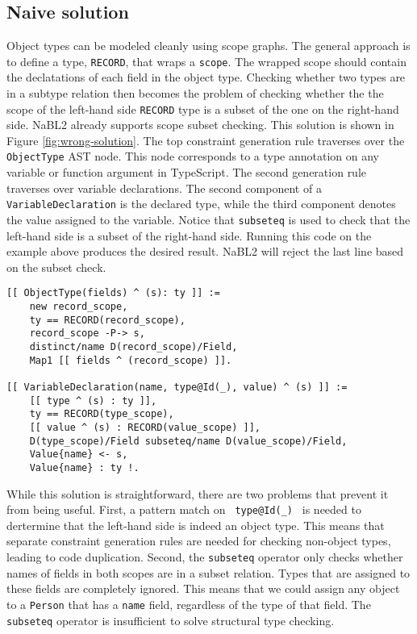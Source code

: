 \subsection{Naive solution}
Object types can be modeled cleanly using scope graphs. 
The general approach is to define a type, \texttt{RECORD}, that wraps a \texttt{scope}.
The wrapped scope should contain the declatations of each field in the object type.
Checking whether two types are in a subtype relation then becomes the problem of checking whether
the the scope of the left-hand side \texttt{RECORD} type is a subset of the one on the right-hand side.
NaBL2 already supports scope subset checking.
This solution is shown in Figure \ref{fig:wrong-solution}.
The top constraint generation rule traverses over the \texttt{ObjectType} AST node.
This node corresponds to a type annotation on any variable or function argument in TypeScript.
The second generation rule traverses over variable declarations.
The second component of a \texttt{VariableDeclaration} is the declared type, 
while the third component denotes the value assigned to the variable.
Notice that \texttt{subseteq} is used to check that the left-hand side is a subset of the right-hand side.
Running this code on the example above produces the desired result.
NaBL2 will reject the last line based on the subset check.
\begin{figure*}[h]
\begin{lstlisting}
[[ ObjectType(fields) ^ (s): ty ]] :=
    new record_scope,
    ty == RECORD(record_scope),
    record_scope -P-> s,
    distinct/name D(record_scope)/Field,
    Map1 [[ fields ^ (record_scope) ]].

[[ VariableDeclaration(name, type@Id(_), value) ^ (s) ]] :=
    [[ type ^ (s) : ty ]],
    ty == RECORD(type_scope),
    [[ value ^ (s) : RECORD(value_scope) ]],
    D(type_scope)/Field subseteq/name D(value_scope)/Field,
    Value{name} <- s,
    Value{name} : ty !.
\end{lstlisting}
\caption{Naive solution to object type checking.}
\label{fig:wrong-solution}
\end{figure*}

While this solution is straightforward, there are two problems that prevent it from being useful.
First, a pattern match on \texttt{ type@Id(\_) } is needed to dertermine that the left-hand side is indeed an object type. 
This means that separate constraint generation rules are needed for checking non-object types, leading to code duplication.
Second, the \texttt{subseteq} operator only checks whether names of fields in both scopes are in a subset relation.
Types that are assigned to these fields are completely ignored.
This means that we could assign any object to a \texttt{Person} that has a \texttt{name} field, 
regardless of the type of that field.
The \texttt{subseteq} operator is insufficient to solve structural type checking.


